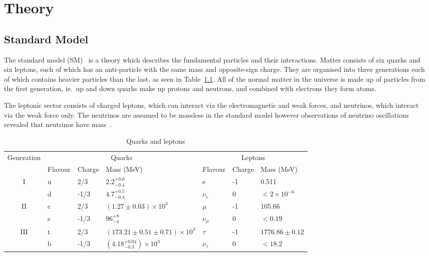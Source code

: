 \chapter{Theory}
\label{c:theory}

\section{Standard Model}

The standard model (SM)~\cite{Glashow:1961tr,Salam:1968rm,PhysRevLett.19.1264,DGriff} is a theory which describes the fundamental particles and their interactions. Matter consists of six quarks and six leptons, each of which has an anti-particle with the same mass and opposite-sign charge. They are organised into three generations each of which contains heavier particles than the last, as seen in Table~\ref{table:SMmatter}. All of the normal matter in the universe is made up of particles from the first generation, ie.~up and down quarks make up protons and neutrons, and combined with electrons they form atoms. 

The leptonic sector consists of charged leptons, which can interact via the electromagnetic and weak forces, and neutrinos, which interact via the weak force only. The neutrinos are assumed to be massless in the standard model however observations of neutrino oscillations revealed that neutrinos have mass~\cite{PhysRevC.88.025501}.

\vspace{0.8cm}
\begin{table}[ht!]
\centering
\caption{Quarks and leptons}
\label{table:SMmatter}
\footnotesize
\begin{tabular}{|c|l|l|l|l|l|l|}
\hline
\multirow{2}{*}{Generation} & \multicolumn{3}{c|}{Quarks}                             & \multicolumn{3}{c|}{Leptons}              \\ \cline{2-7} 
                            & Flavour & Charge & Mass (MeV)                           & Flavour      & Charge & Mass (MeV)        \\ \hline
\hline

\multirow{2}{*}{I}          & u       & 2/3    & $2.2^{+0.6}_{-0.4}$                  & e            & -1     & 0.511             \\
                            & d       & -1/3   & $4.7^{+0.5}_{-0.4}$                  & $\nu_{e}$    & 0      & $<2\times10^{-6}$ \\ \hline
\multirow{2}{*}{II}         & c       & 2/3    & $(1.27\pm 0.03)\times10^{3}$         & $\mu$        & -1     & 105.66            \\
                            & s       & -1/3   & $96^{+8}_{-4}$                       & $\nu_{\mu}$  & 0      & $<0.19$           \\ \hline
\multirow{2}{*}{III}        & t       & 2/3    & $(173.21\pm0.51\pm0.71)\times10^{3}$ & $\tau$       & -1     & $1776.86\pm0.12$  \\
                            & b       & -1/3   & $(4.18^{+0.04}_{-0.3})\times10^{3}$  & $\nu_{\tau}$ & 0      & $<18.2$           \\ \hline
\end{tabular}
\end{table}

